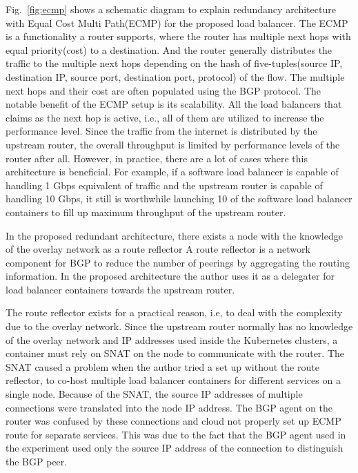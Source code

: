 Fig.~\ref{fig:ecmp} shows a schematic diagram to explain redundancy architecture with Equal Cost Multi Path(ECMP) for the proposed load balancer.
%
The ECMP is a functionality a router supports, where the router has multiple next hops with equal priority(cost) to a destination.
And the router generally distributes the traffic to the multiple next hops depending on the hash of five-tuples(source IP, destination IP, source port, destination port, protocol) of the flow.
The multiple next hops and their cost are often populated using the BGP protocol.
%
The notable benefit of the ECMP setup is its scalability.
All the load balancers that claims as the next hop is active, i.e., all of them are utilized to increase the performance level.
Since the traffic from the internet is distributed by the upstream router, the overall throughput is limited by performance levels of the router after all.
However, in practice, there are a lot of cases where this architecture is beneficial.
For example, if a software load balancer is capable of handling 1 Gbps equivalent of traffic and the upstream router is capable of handling 10 Gbps, it still is worthwhile launching 10 of the software load balancer containers to fill up maximum throughput of the upstream router.

%
In the proposed redundant architecture, there exists a node with the knowledge of the overlay network as a route reflector
A route reflector is a network component for BGP to reduce the number of peerings by aggregating the routing information\cite{rfc4456}.
In the proposed architecture the author uses it as a delegater for load balancer containers towards the upstream router.

The route reflector exists for a practical reason, i.e, to deal with the complexity due to the overlay network.
Since the upstream router normally has no knowledge of the overlay network and IP addresses used inside the Kubernetes clusters, a container must rely on SNAT on the node to communicate with the router.
The SNAT caused a problem when the author tried a set up without the route reflector, to co-host multiple load balancer containers for different services on a single node.
Because of the SNAT, the source IP addresses of multiple connections were translated into the node IP address.
The BGP agent on the router was confused by these connections and cloud not properly set up ECMP route for separate services.
This was due to the fact that the BGP agent used in the experiment used only the source IP address of the connection to distinguish the BGP peer.

